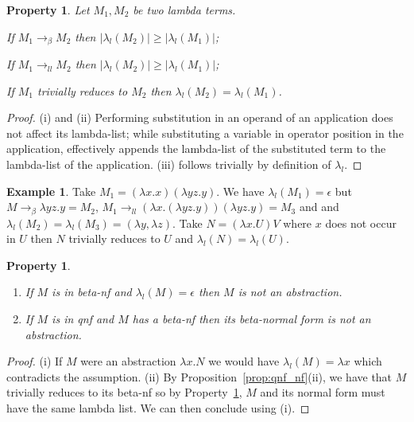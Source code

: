 \documentclass{elsarticle}
\theoremstyle{plain}
\newtheorem{property}[theorem]{Property}
\theoremstyle{definition}
\newtheorem{example}{Example}[section]
\newcommand{\llred}{\rightarrow_{ll}}
\begin{document}

\begin{property}
\label{property:lambdalist_linearred}
    Let $M_1, M_2$ be two lambda terms.
    \begin{enumerate*}[noitemsep,label=(\roman*)]
        \item If $M_1 \rightarrow_\beta M_2$ then $|\lambda_l(M_2)| \geq
        |\lambda_l(M_1)|$;
        \item If $M_1 \llred M_2$ then $|\lambda_l(M_2)| \geq
        |\lambda_l(M_1)|$;
        \item If $M_1$ trivially reduces to $M_2$ then $\lambda_l(M_2) =
        \lambda_l(M_1)$.
    \end{enumerate*}
\end{property}
\begin{proof}
    (i) and (ii) Performing substitution in an operand of an application does not affect its lambda-list; while substituting a variable in operator position in the application, effectively appends the lambda-list of the substituted term to the lambda-list of the application.
    (iii) follows trivially by definition of $\lambda_l$.
\end{proof}
\begin{example}
Take $M_1 = (\lambda x . x) (\lambda y z . y)$. We have $\lambda_l(M_1) = \epsilon$ but $M \rightarrow_\beta \lambda y z . y = M_2$,
$M_1 \llred (\lambda x . (\lambda y z . y)) (\lambda y z . y) = M_3$ and
and $\lambda_l(M_2) = \lambda_l(M_3) = (\lambda y, \lambda z)$.
Take $N = (\lambda x . U) V$ where $x$ does not occur in $U$ then $N$ trivially reduces to $U$ and $\lambda_l(N) = \lambda_l(U)$.
\end{example}

\begin{property}
\label{prop:qnf_betanf_empty_lambdalist}
    \begin{enumerate}[noitemsep,label=(\roman*)]
    \item If $M$ is in beta-nf and $\lambda_l(M) = \epsilon$ then $M$ is not an abstraction.
    \item If $M$ is in \emph{qnf} and $M$ has a beta-nf then its beta-normal form is not an abstraction.
    \end{enumerate}
\end{property}
\begin{proof}
(i) If $M$ were an abstraction $\lambda x. N$ we would have $\lambda_l(M) = \lambda x$ which contradicts the assumption.
(ii) By Proposition~\ref{prop:qnf_nf}(ii), we have that $M$ trivially reduces to
its beta-nf so by Property~\ref{property:lambdalist_linearred},
$M$ and its normal form must have the same lambda list. We can then conclude using (i).
\end{proof}
\end{document}
